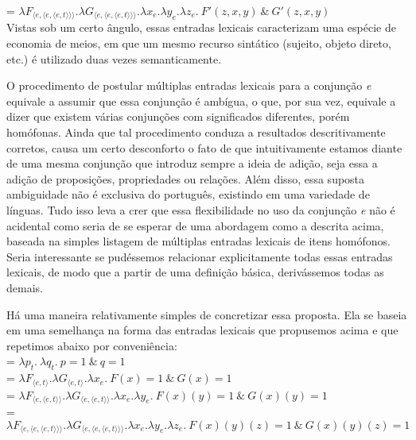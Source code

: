 \n {} = $\lambda F_{\langle e,\langle e, \langle
	e,t\rangle\rangle\rangle}.\lambda G_{\langle e,\langle e, \langle
	e,t\rangle\rangle\rangle}.\lambda x_{e}.\lambda y_{e}.\lambda
z_{e}.\ F'(z,x,y)\ \&\ G'(z,x,y)$\\

Vistas sob um certo ângulo, essas entradas lexicais caracterizam uma espécie de economia de meios, em que um mesmo recurso sintático (sujeito, objeto direto, etc.) é utilizado duas vezes semanticamente.

O procedimento de postular múltiplas entradas lexicais para a
conjun\-ção \textit{e} equivale a assumir que essa conjun\-ção é ambígua,
o que, por sua vez, equivale a dizer que existem várias
conjun\-çõ\-es com significados diferentes, porém homófonas. Ainda
que tal procedimento conduza a resultados descritivamente
corretos, causa um certo desconforto o fato de que intuitivamente
estamos diante de uma mesma conjun\-ção que introduz sempre a
ideia de adi\-ção, seja essa a adi\-ção de proposi\-çõ\-es,
propriedades ou rela\-çõ\-es. Além disso, essa suposta ambiguidade
não é exclusiva do português, existindo em uma variedade de
línguas. Tudo isso leva a crer que essa flexibilidade no uso da
conjun\-ção \textit{e} não é acidental como seria de se esperar de uma
abordagem como a descrita acima, baseada na simples listagem de
múltiplas entradas lexicais de itens homófonos. Seria interessante
se pudéssemos relacionar explicitamente todas essas entradas
lexicais, de modo que a partir de uma defini\-ção básica,
derivássemos todas as demais.

Há uma maneira relativamente simples de concretizar essa proposta.
Ela se baseia em uma semelhan\-ça na forma das entradas lexicais
que propusemos acima e que repetimos abaixo por conveniência:\\


\n {} = $\lambda p_{t}.\ \lambda q_{t}.\ p=1\ \&\
q=1$\\

\n {} = $\lambda F_{\langle e,t\rangle}.\lambda G_{\langle
e,t\rangle}.\lambda x_{e}.\ F(x)=1\ \&\ G(x)=1$\\

\n {} = $\lambda F_{\langle e,\langle
e,t\rangle\rangle}.\lambda G_{\langle e,\langle
e,t\rangle\rangle}.\lambda x_{e}.\lambda y_{e}.\ F(x)(y)=1\ \&\
G(x)(y)=1$\\

\n {} = $\lambda F_{\langle e,\langle e, \langle
e,t\rangle\rangle\rangle}.\lambda G_{\langle e,\langle e, \langle
e,t\rangle\rangle\rangle}.\lambda x_{e}.\lambda y_{e}.\lambda
z_{e}.\ F(x)(y)(z)=1\ \&\ G(x)(y)(z)=1$\\


